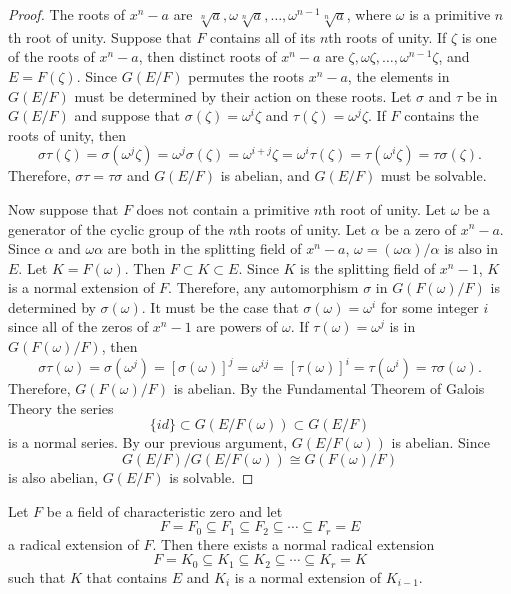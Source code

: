  
\begin{proof}
The roots of $x^n - a$ are $\sqrt[n]{a}, \omega	\sqrt[n]{a}, \ldots,
\omega^{n-1} \sqrt[n]{a}$, where $\omega$ is a primitive $n$th root of
unity.  Suppose that $F$ contains all of its $n$th roots of unity. 
If $\zeta$ is one of the roots of  $x^n - a$, then distinct roots of $x^n
- a$ are $\zeta, \omega \zeta, \ldots, \omega^{n-1} \zeta$, and $E =
F(\zeta)$. Since $G(E/F)$ permutes the roots $x^n - a$, the elements in 
$G(E/F)$ must be determined by their action on these roots. Let $\sigma$ 
and $\tau$ be in $G(E/F)$ and suppose that $\sigma( \zeta ) = \omega^i 
\zeta$ and $\tau( \zeta ) = \omega^j \zeta$. If $F$ contains the
roots of unity, then 
\[
\sigma \tau( \zeta ) = \sigma( \omega^j \zeta) = \omega^j \sigma(
\zeta ) = \omega^{i+j} \zeta = \omega^i \tau( \zeta ) = \tau( \omega^i
\zeta ) = \tau \sigma( \zeta ). 
\]
Therefore, $\sigma \tau = \tau \sigma$ and $G(E/F)$ is abelian, and
$G(E/F)$ must be solvable. 

 
 
 
Now suppose that $F$ does not contain a primitive $n$th root of unity.
Let $\omega$ be a generator of the cyclic group of the $n$th roots
of unity.  Let $\alpha$ be a zero of $x^n - a$. Since $\alpha$ and
$\omega \alpha$ are both in the splitting field of $x^n - a$, $\omega
= (\omega \alpha)/ \alpha$ is also in $E$. Let $K = F( \omega)$. Then
$F \subset K \subset E$. Since $K$ is the splitting field of $x^n -
1$, $K$ is a normal extension of $F$.  Therefore, any automorphism $\sigma$ in
$G(F( \omega)/ F)$ is determined by $\sigma( \omega)$.  It must be
the case that $\sigma( \omega ) = \omega^i$ for some integer $i$ since
all of the zeros of $x^n-1$ are powers of $\omega$. If $\tau( \omega
) = \omega^j$ is in $G(F(\omega)/F)$, then
\[
\sigma \tau( \omega ) = \sigma( \omega^j ) = [ \sigma(
\omega )]^j = \omega^{ij} = [\tau( \omega ) ]^i = \tau( \omega^i ) 
= \tau \sigma( \omega ). 
\]
Therefore, $G(F( \omega ) / F)$ is abelian.  By the Fundamental
Theorem of Galois Theory the series 
\[
\{ id \} \subset G(E/ F(\omega)) \subset G(E/F)
\]
is a normal series. By our previous argument, $G(E/F(\omega))$ is abelian.  Since
\[
G(E/F) /G(E/F( \omega)) \cong G(F(\omega)/F)
\]
is also abelian, $G(E/F)$ is solvable.
\end{proof}

 
 
 
\begin{lemma}\label{galois:radical_extension_lemma}
Let $F$ be a field of characteristic zero and let
\[
F = F_0 \subseteq F_1 \subseteq F_2 \subseteq \cdots \subseteq F_r = E
\]
a radical extension of $F$. Then there exists a normal radical extension 
\[
F = K_0 \subseteq K_1 \subseteq K_2 \subseteq \cdots \subseteq K_r = K
\]
such that $K$ that contains $E$ and $K_i$ is a normal extension of $K_{i-1}$.
\end{lemma}
 
